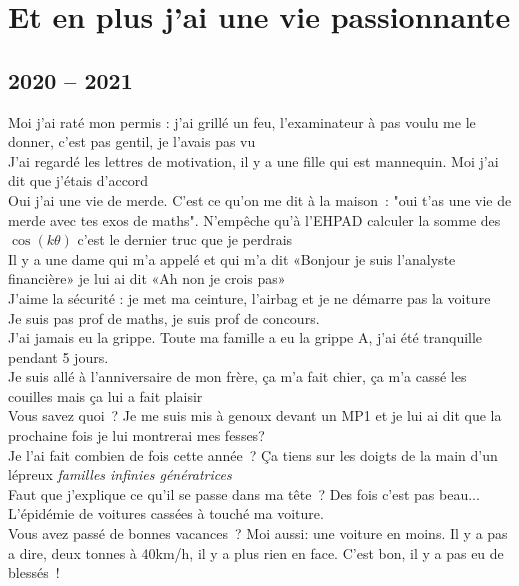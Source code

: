 \documentclass[french, a4paper, openany]{book}
\begin{document}
\section*{Et en plus j'ai une vie passionnante}

	\subsection*{2020 -- 2021}
		\noindent \og Moi j'ai raté mon permis : j'ai grillé un feu, l'examinateur à pas voulu me le donner, c'est pas gentil, je l'avais pas vu \fg \\
		\og J'ai regardé les lettres de motivation, il y a une fille qui est mannequin. Moi j'ai dit que j'étais d'accord \fg \\
		\og Oui j'ai une vie de merde. C'est ce qu'on me dit à la maison~: "oui t'as une vie de merde avec tes exos de maths". N'empêche qu'à l'EHPAD calculer la somme des $\cos(k \theta)$ c'est le dernier truc que je perdrais \fg \\
		\og Il y a une dame qui m'a appelé et qui m'a dit «Bonjour je suis l'analyste financière» je lui ai dit «Ah non je crois pas» \fg \\
		\og J'aime la sécurité : je met ma ceinture, l'airbag et je ne démarre pas la voiture \fg \\
		\og Je suis pas prof de maths, je suis prof de concours. \fg \\
		\og J'ai jamais eu la grippe. Toute ma famille a eu la grippe A, j'ai été tranquille pendant 5 jours. \fg \\
		\og Je suis allé à l'anniversaire de mon frère, ça m'a fait chier, ça m'a cassé les couilles mais ça lui a fait plaisir \fg \\
		\og Vous savez quoi~? Je me suis mis à genoux devant un MP1 et je lui ai dit que la prochaine fois je lui montrerai mes fesses? \fg \\
		\og Je l'ai fait combien de fois cette année~? Ça tiens sur les doigts de la main d'un lépreux \fg \emph{familles infinies génératrices} \\
		\og Faut que j'explique ce qu'il se passe dans ma tête~? Des fois c'est pas beau... \fg \\
		\og L'épidémie de voitures cassées à touché ma voiture. \fg \\
		\og Vous avez passé de bonnes vacances~? Moi aussi: une voiture en moins. Il y a pas a dire, deux tonnes à 40km/h, il y a plus rien en face. C'est bon, il y a pas eu de blessés~! \fg \\
	
\end{document}

